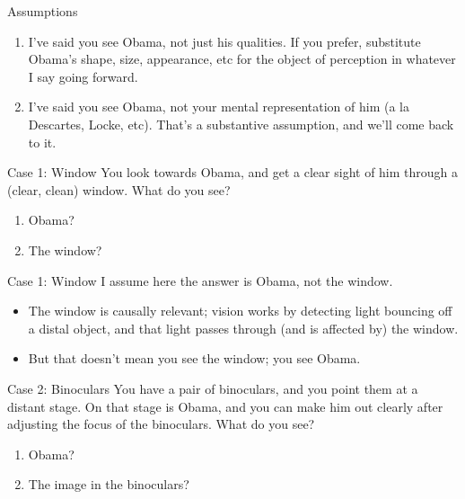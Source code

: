 \documentclass[
  17pt,
  letterpaper,
  ignorenonframetext,
  aspectratio=169,
  handout]{beamer}
\providecommand{\tightlist}{%
  \setlength{\itemsep}{0pt}\setlength{\parskip}{0pt}}\usepackage{longtable,booktabs,array}
\begin{document}
\begin{frame}{Assumptions}
\protect\hypertarget{assumptions}{}
\begin{enumerate}[<+->]
\tightlist
\item
  I've said you see Obama, not just his qualities. If you prefer,
  substitute Obama's shape, size, appearance, etc for the object of
  perception in whatever I say going forward.
\item
  I've said you see Obama, not your mental representation of him (a la
  Descartes, Locke, etc). That's a substantive assumption, and we'll
  come back to it.
\end{enumerate}
\end{frame}

\begin{frame}{Case 1: Window}
\protect\hypertarget{case-1-window}{}
You look towards Obama, and get a clear sight of him through a (clear,
clean) window. What do you see?

\begin{enumerate}[<+->]
\tightlist
\item
  Obama?
\item
  The window?
\end{enumerate}
\end{frame}

\begin{frame}{Case 1: Window}
\protect\hypertarget{case-1-window-1}{}
I assume here the answer is Obama, not the window.

\begin{itemize}[<+->]
\tightlist
\item
  The window is causally relevant; vision works by detecting light
  bouncing off a distal object, and that light passes through (and is
  affected by) the window.
\item
  But that doesn't mean you see the window; you see Obama.
\end{itemize}
\end{frame}

\begin{frame}{Case 2: Binoculars}
\protect\hypertarget{case-2-binoculars}{}
You have a pair of binoculars, and you point them at a distant stage. On
that stage is Obama, and you can make him out clearly after adjusting
the focus of the binoculars. What do you see?

\begin{enumerate}[<+->]
\tightlist
\item
  Obama?
\item
  The image in the binoculars?
\end{enumerate}
\end{frame}
\end{document}
